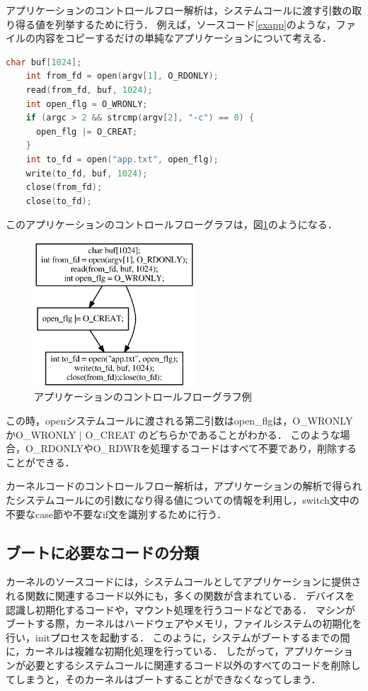 \documentclass[graduation-thesis]{mlarticle}
\begin{document}
アプリケーションのコントロールフロー解析は，システムコールに渡す引数の取り得る値を列挙するために行う．
例えば，ソースコード\ref{exapp}のような，ファイルの内容をコピーするだけの単純なアプリケーションについて考える．

\begin{lstlisting}[language=C, caption=アプリケーションの例, label=exapp]
    char buf[1024];
    int from_fd = open(argv[1], O_RDONLY);
    read(from_fd, buf, 1024);
    int open_flg = O_WRONLY;
    if (argc > 2 && strcmp(argv[2], "-c") == 0) {
      open_flg |= O_CREAT;
    }
    int to_fd = open("app.txt", open_flg);
    write(to_fd, buf, 1024);
    close(from_fd);
    close(to_fd);
\end{lstlisting}

このアプリケーションのコントロールフローグラフは，図\ref{fig:controlflow}のようになる．

\begin{figure}[H]
  \begin{center}
    \includegraphics[width=6.0cm]{images/controlflow.eps}
    \caption{アプリケーションのコントロールフローグラフ例}
    \label{fig:controlflow}
  \end{center}
\end{figure}

この時，openシステムコールに渡される第二引数はopen\_flgは，O\_WRONLYかO\_WRONLY $|$ O\_CREAT のどちらかであることがわかる．
このような場合，O\_RDONLYやO\_RDWRを処理するコードはすべて不要であり，削除することができる．

カーネルコードのコントロールフロー解析は，アプリケーションの解析で得られたシステムコールにの引数になり得る値についての情報を利用し，switch文中の不要なcase節や不要なif文を識別するために行う．

\subsection{ブートに必要なコードの分類}
\label{propo:boot}
カーネルのソースコードには，システムコールとしてアプリケーションに提供される関数に関連するコード以外にも，多くの関数が含まれている．
デバイスを認識し初期化するコードや，マウント処理を行うコードなどである．
マシンがブートする際，カーネルはハードウェアやメモリ，ファイルシステムの初期化を行い，initプロセスを起動する．
このように，システムがブートするまでの間に，カーネルは複雑な初期化処理を行っている．
したがって，アプリケーションが必要とするシステムコールに関連するコード以外のすべてのコードを削除してしまうと，そのカーネルはブートすることができなくなってしまう．
\end{document}
